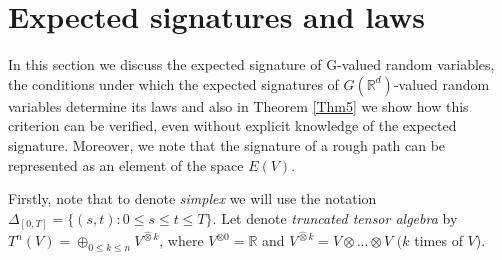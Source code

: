 \documentclass[12pt,a4paper]{report}
\theoremstyle{definition}
\newtheorem{corollary}{Corollary}
\begin{document}
%	
%	
%






\section{Expected signatures and laws}


In this section we discuss  the expected signature of G-valued random
variables, the conditions under which the expected signatures of $G(\mathbb{R}^d)$-valued random variables determine its laws and also in Theorem \ref{Thm5} we show how this criterion can be verified, even without explicit knowledge of the expected signature. Moreover, we note that the signature of a rough path can be represented as an element of the space $E(V)$. 

Firstly, note that to denote \textit{simplex} we will use the notation $\Delta_{[0,T]}=\{(s,t): 0\leq s\leq t\leq T \}$. Let denote \textit{truncated tensor algebra} by $T^n(V) =\oplus_{0\leq k\leq n} V^{\hat{\otimes}k}$, where $V^{\otimes 0}=\mathbb{R}$ and $V^{\hat{\otimes}k}=V\otimes...\otimes V$ $(k$ times of $V$).
\end{document}
